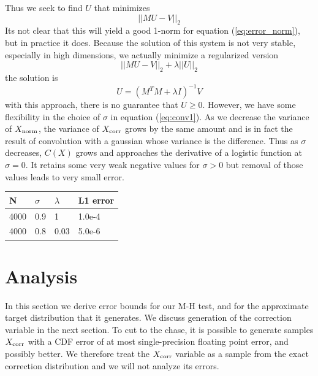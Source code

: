 \documentclass{article}
\begin{document}
Thus we seek to find $U$ that minimizes
\begin{equation}
  ||MU-V||_2
\end{equation}
Its not clear that this will yield a good 1-norm for equation (\ref{eq:error_norm}), but in practice it does.
Because the solution of this system is not very stable, especially in high dimensions, we actually
minimize a regularized version
\begin{equation}
  ||MU-V||_2 + \lambda||U||_2
\end{equation}
the solution is
\begin{equation}
  U = (M^T M + \lambda I)^{-1}V
\end{equation}
with this approach, there is no guarantee that $U \geq 0$. However, we have some
flexibility in the choice of $\sigma$ in equation (\ref{eq:conv1}). As we decrease
the variance of $X_{\rm norm}$, the variance of $X_{\rm corr}$ grows by the same amount
and is in fact the result of convolution with a gaussian whose variance is the difference.
Thus as $\sigma$ decreases, $C(X)$ grows and approaches the derivative of a
logistic function at $\sigma = 0$. It retains some very weak negative values for $\sigma > 0$
but removal of those values leads to very small error.
\begin{table}[h]
  \centering
  \begin{tabular}{|l|l|l|l|}
    \hline
     N & $\sigma$ & $\lambda$ & L1 error  \\
        \hline
     4000 & 0.9 & 1 & 1.0e-4  \\
     4000 & 0.8 & 0.03 & 5.0e-6 \\
     \hline
    \end{tabular}
\end{table}


\section{Analysis}\label{sec:analysis}

In this section we derive error bounds for our M-H test, and for the approximate target
distribution that it generates. We discuss generation of the correction variable in the
next section. To cut to the chase, it is possible to generate samples $X_{\rm corr}$ with
a CDF error of at most single-precision floating point error, and possibly better. We
therefore treat the $X_{\rm corr}$ variable as a sample from the exact correction distribution
and we will not analyze its errors.
\end{document}
